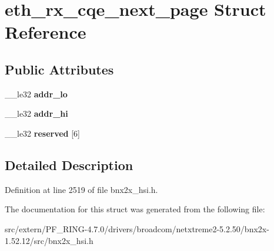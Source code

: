 \hypertarget{structeth__rx__cqe__next__page}{
\section{eth\_\-rx\_\-cqe\_\-next\_\-page Struct Reference}
\label{structeth__rx__cqe__next__page}
}
\subsection*{Public Attributes}
\begin{DoxyCompactItemize}
\item 
\hypertarget{structeth__rx__cqe__next__page_a4eb9f977e6328d2fba583e072d582d24}{
\_\-\_\-le32 {\bfseries addr\_\-lo}}
\label{structeth__rx__cqe__next__page_a4eb9f977e6328d2fba583e072d582d24}

\item 
\hypertarget{structeth__rx__cqe__next__page_a489a17261ad58680efe0cf258c612530}{
\_\-\_\-le32 {\bfseries addr\_\-hi}}
\label{structeth__rx__cqe__next__page_a489a17261ad58680efe0cf258c612530}

\item 
\hypertarget{structeth__rx__cqe__next__page_a6b51f141875363bfae226d65e0d69e07}{
\_\-\_\-le32 {\bfseries reserved} \mbox{[}6\mbox{]}}
\label{structeth__rx__cqe__next__page_a6b51f141875363bfae226d65e0d69e07}

\end{DoxyCompactItemize}


\subsection{Detailed Description}


Definition at line 2519 of file bnx2x\_\-hsi.h.



The documentation for this struct was generated from the following file:\begin{DoxyCompactItemize}
\item 
src/extern/PF\_\-RING-\/4.7.0/drivers/broadcom/netxtreme2-\/5.2.50/bnx2x-\/1.52.12/src/bnx2x\_\-hsi.h\end{DoxyCompactItemize}
